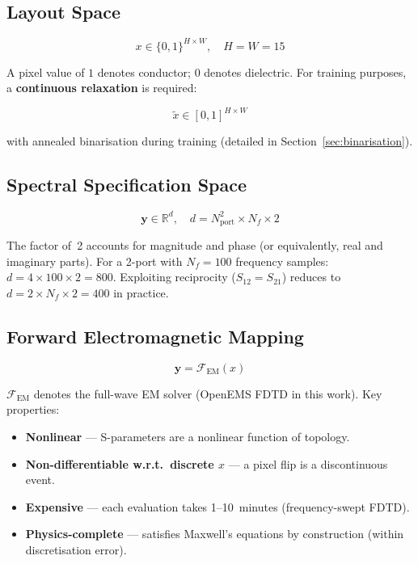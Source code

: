 \documentclass[12pt,a4paper]{article}
\newcommand{\FEM}{\mathcal{F}_{\mathrm{EM}}}
\newcommand{\xtilde}{\tilde{x}}
\newcommand{\HW}{H \times W}
\theoremstyle{definition}
\theoremstyle{plain}
\theoremstyle{remark}
\begin{document}
\subsection{Layout Space}

\begin{equation}
  x \in \{0,1\}^{\HW}, \quad H = W = 15
  \label{eq:layout_space}
\end{equation}

A pixel value of $1$ denotes conductor; $0$ denotes dielectric.
For training purposes, a \textbf{continuous relaxation} is required:

\begin{equation}
  \xtilde \in [0,1]^{\HW}
  \label{eq:relaxed}
\end{equation}

with annealed binarisation during training (detailed in Section~\ref{sec:binarisation}).

\subsection{Spectral Specification Space}

\begin{equation}
  \mathbf{y} \in \mathbb{R}^{d}, \quad
  d = N_{\mathrm{port}}^2 \times N_f \times 2
  \label{eq:spec_space}
\end{equation}

The factor of~2 accounts for magnitude and phase (or equivalently, real and imaginary
parts).
For a 2-port with $N_f = 100$ frequency samples:
$d = 4 \times 100 \times 2 = 800$.
Exploiting reciprocity ($S_{12} = S_{21}$) reduces to $d = 2 \times N_f \times 2 = 400$
in practice.

\subsection{Forward Electromagnetic Mapping}

\begin{equation}
  \mathbf{y} = \FEM(x)
  \label{eq:forward}
\end{equation}

$\FEM$ denotes the full-wave EM solver (OpenEMS FDTD in this work).
Key properties:

\begin{itemize}
  \item \textbf{Nonlinear} — S-parameters are a nonlinear function of topology.
  \item \textbf{Non-differentiable w.r.t.\ discrete $x$} — a pixel flip is a discontinuous event.
  \item \textbf{Expensive} — each evaluation takes 1--10~minutes (frequency-swept FDTD).
  \item \textbf{Physics-complete} — satisfies Maxwell's equations by construction
        (within discretisation error).
\end{itemize}
\end{document}
